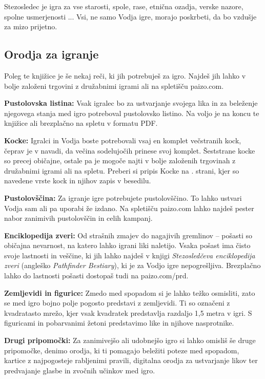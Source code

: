 Stezosledec je igra za vse starosti, spole, rase, etnična ozadja, verske nazore, spolne usmerjenosti ... Vsi, ne samo Vodja igre, morajo poskrbeti, da bo vzdušje za mizo prijetno.

\subsection{Orodja za igranje}

Poleg te knjižice je še nekaj reči, ki jih potrebuješ za igro. Najdeš jih lahko v bolje založeni trgovini z družabnimi igrami ali na spletišču paizo.com.

\textbf{Pustolovska listina:} Vsak igralec bo za ustvarjanje svojega lika in za beleženje njegovega stanja med igro potreboval pustolovsko listino. Na voljo je na koncu te knjižice ali brezplačno na spletu v formatu PDF.

\textbf{Kocke:} Igralci in Vodja boste potrebovali vsaj en komplet večstranih kock, čeprav je v navadi, da večina sodelujočih prinese svoj komplet. Šeststrane kocke so precej običajne, ostale pa je mogoče najti v bolje založenih trgovinah z družabnimi igrami ali na spletu. Preberi si pripis Kocke na \pageref{sidenote-kocke}. strani, kjer so navedene vrste kock in njihov zapis v besedilu.

\textbf{Pustolovščina:} Za igranje igre potrebujete pustolovščino. To lahko ustvari Vodja sam ali pa uporabi že izdano. Na spletišču paizo.com lahko najdeš pester nabor zanimivih pustolovščin in celih kampanj.

\textbf{Enciklopedija zveri:} Od strašnih zmajev do nagajivih gremlinov -- pošasti so običajna nevarnost, na katero lahko igrani liki naletijo. Vsaka pošast ima čisto svoje lastnosti in veščine, ki jih lahko najdeš v knjigi \textit{Stezosledčeva enciklopedija zveri} (angleško \textit{Pathfinder Bestiary}), ki je za Vodjo igre nepogrešljiva. Brezplačno lahko do lastnosti pošasti dostopaš tudi na paizo.com/prd.

\textbf{Zemljevidi in figurice:} Zmedo med spopadom si je lahko težko osmisliti, zato se med igro bojno polje pogosto predstavi z zemljevidi. Ti so označeni z kvadratasto mrežo, kjer vsak kvadratek predstavlja razdaljo 1,5 metra v igri. S figuricami in pobarvanimi žetoni predstavimo like in njihove nasprotnike.

\textbf{Drugi pripomočki:} Za zanimivejšo ali udobnejšo igro si lahko omisliš še druge pripomočke, denimo orodja, ki ti pomagajo beležiti poteze med spopadom, kartice z najpogosteje rabljenimi pravili, digitalna orodja za ustvarjanje likov ter predvajanje glasbe in zvočnih učinkov med igro.

